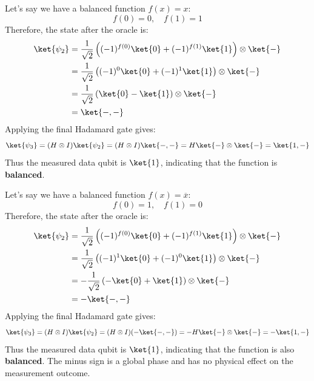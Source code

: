 \highspace
\begin{examplebox}[: $f(x) = x$]
    Let's say we have a balanced function $f(x) = x$:
    \begin{equation*}
        f(0) = 0, \quad f(1) = 1
    \end{equation*}
    Therefore, the state after the oracle is:
    \begin{align*}
        \ket{\psi_2} &= \frac{1}{\sqrt{2}} \left( (-1)^{f(0)}\ket{0} + (-1)^{f(1)}\ket{1} \right) \otimes \ket{-} \\
        &= \frac{1}{\sqrt{2}} \left( (-1)^{0}\ket{0} + (-1)^{1}\ket{1} \right) \otimes \ket{-} \\
        &= \frac{1}{\sqrt{2}} \left( \ket{0} - \ket{1} \right) \otimes \ket{-} \\
        &= \ket{-,-}
    \end{align*}
    Applying the final Hadamard gate gives:
    \begin{equation*}
        \ket{\psi_3} = (H \otimes I)\ket{\psi_2} = (H \otimes I)\ket{-,-} = H\ket{-} \otimes \ket{-} = \ket{1,-}
    \end{equation*}
    Thus the measured data qubit is $\ket{1}$, indicating that the function is \textbf{balanced}.
\end{examplebox}

\highspace
\begin{examplebox}[: $f(x) = \overline{x}$]
    Let's say we have a balanced function $f(x) = \overline{x}$:
    \begin{equation*}
        f(0) = 1, \quad f(1) = 0
    \end{equation*}
    Therefore, the state after the oracle is:
    \begin{align*}
        \ket{\psi_2} &= \frac{1}{\sqrt{2}} \left( (-1)^{f(0)}\ket{0} + (-1)^{f(1)}\ket{1} \right) \otimes \ket{-} \\
        &= \frac{1}{\sqrt{2}} \left( (-1)^{1}\ket{0} + (-1)^{0}\ket{1} \right) \otimes \ket{-} \\
        &= -\frac{1}{\sqrt{2}} \left( -\ket{0} + \ket{1} \right) \otimes \ket{-} \\
        &= -\ket{-,-}
    \end{align*}
    Applying the final Hadamard gate gives:
    \begin{equation*}
        \ket{\psi_3} = (H \otimes I)\ket{\psi_2} = (H \otimes I)(-\ket{-,-}) = -H\ket{-} \otimes \ket{-} = -\ket{1,-}
    \end{equation*}
    Thus the measured data qubit is $\ket{1}$, indicating that the function is also \textbf{balanced}. The minus sign is a global phase and has no physical effect on the measurement outcome.
\end{examplebox}